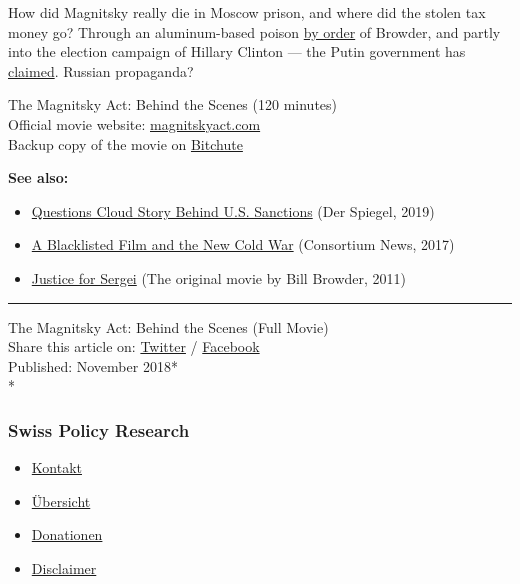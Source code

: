 How did Magnitsky really die in Moscow prison, and where did the stolen
tax money go? Through an aluminum-based poison
\href{https://www.newsweek.com/russia-american-bill-browder-poisoning-lawyer-putin-1221857}{by
order} of Browder, and partly into the election campaign of Hillary
Clinton --- the Putin government has
\href{http://tass.com/world/1013707}{claimed}. Russian propaganda?

The Magnitsky Act: Behind the Scenes (120 minutes)\\
Official movie website:
\href{http://magnitskyact.com/}{magnitskyact.com}\\
Backup copy of the movie on
\href{https://www.bitchute.com/video/NlrR5zFDoTRj/}{Bitchute}

\textbf{See also:}

\begin{itemize}
\tightlist
\item
  \href{https://www.spiegel.de/international/world/the-case-of-sergei-magnitsky-anti-corruption-champion-or-corrupt-anti-hero-a-1297796.html}{Questions
  Cloud Story Behind U.S. Sanctions} (Der Spiegel, 2019)
\item
  \href{https://consortiumnews.com/2017/08/02/a-blacklisted-film-and-the-new-cold-war/}{A
  Blacklisted Film and the New Cold War} (Consortium News, 2017)
\item
  \href{https://www.youtube.com/watch?v=x6PQNFcog3s}{Justice for Sergei}
  (The original movie by Bill Browder, 2011)
\end{itemize}

\begin{center}\rule{0.5\linewidth}{\linethickness}\end{center}

The Magnitsky Act: Behind the Scenes (Full Movie)\\
Share this article on:
\href{https://twitter.com/intent/tweet?url=https://swprs.org/the-magnitsky-act/}{Twitter}
/
\href{https://www.facebook.com/share.php?u=https://swprs.org/the-magnitsky-act/}{Facebook}\\
Published: November 2018*\\
*

\hypertarget{swiss-policy-research}{%
\subsubsection{Swiss Policy Research}\label{swiss-policy-research}}

\begin{itemize}
\tightlist
\item
  \href{https://swprs.org/kontakt/}{Kontakt}
\item
  \href{https://swprs.org/uebersicht/}{Übersicht}
\item
  \href{https://swprs.org/donationen/}{Donationen}
\item
  \href{https://swprs.org/disclaimer/}{Disclaimer}
\end{itemize}

